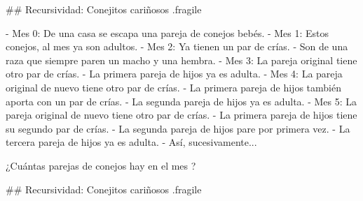 ## Recursividad: Conejitos cariñosos {.fragile}


\vspace{-2ex}

- Mes 0: De una casa se escapa una pareja de conejos bebés.
- Mes 1: Estos conejos, al mes ya son adultos.
- Mes 2: Ya tienen un par de crías.
    - Son de una raza que siempre paren un macho y una hembra.
- Mes 3: La pareja original tiene otro par de crías.
    - La primera pareja de hijos ya es adulta.
- Mes 4: La pareja original de nuevo tiene otro par de crías.
    - La primera pareja de hijos también aporta con un par de crías.
    - La segunda pareja de hijos ya es adulta.
- Mes 5: La pareja original de nuevo tiene otro par de crías.
    - La primera pareja de hijos tiene su segundo par de crías.
    - La segunda pareja de hijos pare por primera vez.
    - La tercera pareja de hijos ya es adulta.
- Así, sucesivamente...

\bgnblocknormal
¿Cuántas parejas de conejos hay en el mes ?
\trmblocknormal


## Recursividad: Conejitos cariñosos {.fragile}

